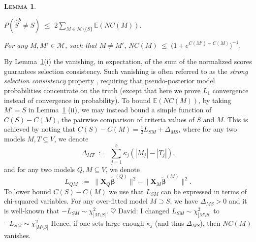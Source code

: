 \documentclass[aos]{imsart}
\theoremstyle{plain}
\newtheorem{lem}{\textsc{Lemma}}[section]
\newcommand{\david}[1]{{\small{\color{blue} \sf $\heartsuit$ David: #1}}}
\newcommand{\E}{\mathbb{E}}
\newcommand{\bs}{\boldsymbol}
\begin{document}
\begin{lem}\label{lem:L0toL1convergence} %
\begin{longlist}
\item 
$P(\hat{S}^{b} \neq S) \,\,\leq \,\, 2 \sum_{M \in \mathcal{M}\setminus \{S\}} \E\left(NC(M)\right).$
\item  For any $M,M'\in\mathcal{M}$, such that $M\neq M'$, 
$NC(M)\;\leq \;\big(1+e^{C(M')-C(M)}\big)^{-1}$.
\end{longlist}
\end{lem}
By Lemma~\ref{lem:L0toL1convergence}(i) the vanishing, in expectation, of the sum of the normalized scores %
guarantees selection consistency. Such vanishing is often referred to as the \textit{strong selection consistency} property \citep{narisettyhe2014}, requiring that pseudo-posterior model probabilities concentrate on the truth (except that here we prove $L_1$ convergence instead of convergence in probability).
To bound $\E(NC(M))$, by taking $M'=S$ in Lemma~\ref{lem:L0toL1convergence} (ii), we may instead bound a simple function of $C(S)-C(M)$, the pairwise comparison of criteria values of $S$ and $M$. 
This is achieved by noting that $C(S)-C(M)=\tfrac12 L_{SM}+\Delta_{MS}$, where for any two models $M,T\subseteq V$, we denote
\begin{equation}\label{eq:DeltaM}
\Delta_{MT}\;:=\;\sum_{j=1}^b \kappa_j(|M_j|-|T_j|). 
\end{equation}
and for any two models $Q,M\subseteq V$, we denote 
$$L_{QM}\;:=\;\|\bs X_{Q}\tilde{\bs\beta}^{(Q)}\|^2-\|\bs X_{M}\tilde{\bs\beta}^{(M)}\|^2.$$
To lower bound $C(S)-C(M)$ we use that $L_{SM}$ can be expressed in terms of chi-squared variables.
For any over-fitted model $M \supset S$, we have $\Delta_{MS}>0$ and it is well-known that $-L_{SM} \sim \chi_{|M \setminus S|}^2$.
\david{I changed $L_{SM} \sim \chi_{|M \setminus S|}^2$ to $-L_{SM} \sim \chi_{|M \setminus S|}^2$}
Hence, if one sets large enough $\kappa_j$ (and thus $\Delta_{MS}$), then $NC(M)$ vanishes.
\end{document}
